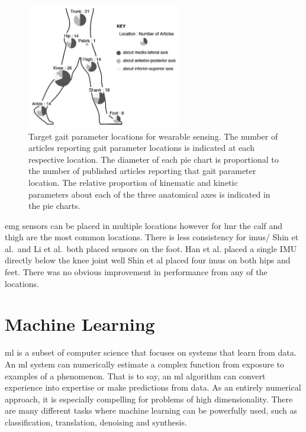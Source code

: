 \begin{figure}[!hbt]
    \centering
    \includegraphics[width=0.6\textwidth]{content/2-Background/shull-2014-sensor-placement.pdf}
    \caption[Target gait parameter locations for wearable sensing]{Target gait parameter locations for wearable sensing. The number of articles reporting gait parameter locations is indicated at each respective location. The diameter of each pie chart is proportional to the number of published articles reporting that gait parameter location. The relative proportion of kinematic and kinetic parameters about each of the three anatomical axes is indicated in the pie charts.}
    \label{fig:shull-sensor-location}
\end{figure}

\acrshort{emg} sensors can be placed in multiple locations however for \acrlong{lmr} the calf and thigh are the most common locations\cite{Xi2019, Li2016, Wang2021a}. There is less consistency for \acrshort{imu}s/ Shin et al.~and Li et al.~both placed sensors on the foot\cite{Shin2021, Li2019a}. Han et al. placed a single IMU directly below the knee joint\cite{Han2021} well Shin et al placed four \acrshort{imu}s on both hips and feet\cite{Shin2021}. There was no obvious improvement in performance from any of the locations.


\section{Machine Learning}
\label{sec:background-machine-learning}
\acrfull{ml} is a subset of computer science that focuses on systems that learn from data. An \acrshort{ml} system can numerically estimate a complex function from exposure to examples of a phenomenon. That is to say, an \acrshort{ml} algorithm can convert experience into expertise or make predictions from data. As an entirely numerical approach, it is especially compelling for problems of high dimensionality. There are many different tasks where machine learning can be powerfully used, such as classification, translation, denoising and synthesis.\cite{Mitchell1997, Shalev-Shwartz2014, Goodfellow2015, Burkov2019}

